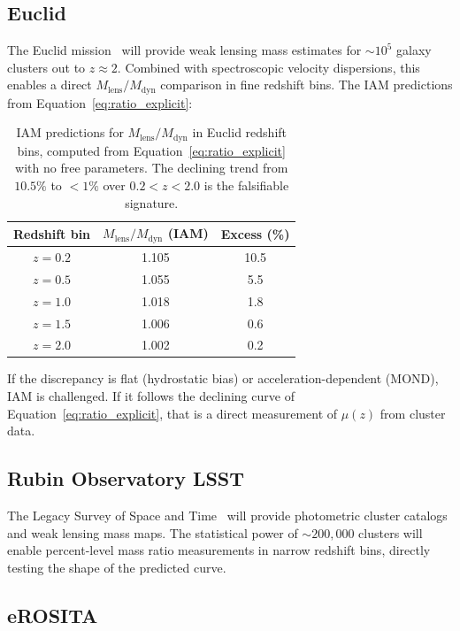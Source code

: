 \documentclass[12pt,a4paper]{article}
\begin{document}
\subsection{Euclid}

The Euclid mission~\citep{Euclid2022} will provide weak lensing mass estimates
for $\sim 10^5$ galaxy clusters out to $z \approx 2$. Combined with spectroscopic
velocity dispersions, this enables a direct $M_\mathrm{lens}/M_\mathrm{dyn}$
comparison in fine redshift bins. The IAM predictions from
Equation~\ref{eq:ratio_explicit}:

\begin{table}[h]
\centering
\caption{IAM predictions for $M_\mathrm{lens}/M_\mathrm{dyn}$ in Euclid redshift
bins, computed from Equation~\ref{eq:ratio_explicit} with no free parameters.
The declining trend from $10.5\%$ to $<1\%$ over $0.2 < z < 2.0$ is the
falsifiable signature.}
\label{tab:euclid}
\begin{tabular}{ccc}
\toprule
Redshift bin & $M_\mathrm{lens}/M_\mathrm{dyn}$ (IAM) & Excess (\%) \\
\midrule
$z = 0.2$ & 1.105 & 10.5 \\
$z = 0.5$ & 1.055 &  5.5 \\
$z = 1.0$ & 1.018 &  1.8 \\
$z = 1.5$ & 1.006 &  0.6 \\
$z = 2.0$ & 1.002 &  0.2 \\
\bottomrule
\end{tabular}
\end{table}

If the discrepancy is flat (hydrostatic bias) or acceleration-dependent (MOND),
IAM is challenged. If it follows the declining curve of
Equation~\ref{eq:ratio_explicit}, that is a direct measurement of $\mu(z)$ from
cluster data.

\subsection{Rubin Observatory LSST}

The Legacy Survey of Space and Time~\citep{LSST2009} will provide photometric
cluster catalogs and weak lensing mass maps. The statistical power of
$\sim 200{,}000$ clusters will enable percent-level mass ratio measurements in
narrow redshift bins, directly testing the shape of the predicted curve.

\subsection{eROSITA}
\end{document}
